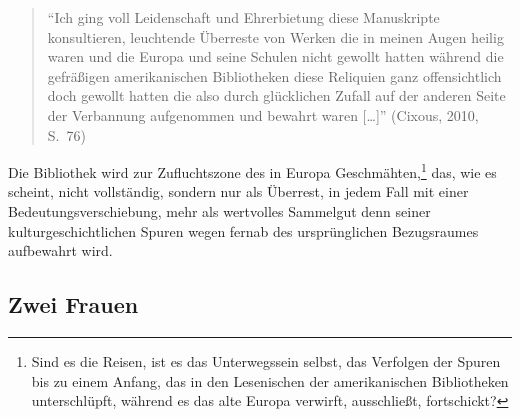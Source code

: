 \documentclass[output=paper]{langscibook}
\begin{document}
\begin{quote}
\enquote{Ich ging voll Leidenschaft und Ehrerbietung diese Manuskripte
konsultieren, leuchtende Überreste von Werken die in meinen Augen heilig
waren und die Europa und seine Schulen nicht gewollt hatten während die
gefräßigen amerikanischen Bibliotheken diese Reliquien ganz
offensichtlich doch gewollt hatten die also durch glücklichen Zufall auf
der anderen Seite der Verbannung aufgenommen und bewahrt waren
{[}\ldots{]}} (Cixous, 2010, S.~76)
\end{quote}

\noindent Die Bibliothek wird zur Zufluchtszone des in Europa
Geschmähten,\footnote{Sind es die Reisen, ist es das Unterwegssein
  selbst, das Verfolgen der Spuren bis zu einem Anfang, das in den
  Lesenischen der amerikanischen Bibliotheken unterschlüpft, während es
  das alte Europa verwirft, ausschließt, fortschickt?} das, wie es
scheint, nicht vollständig, sondern nur als Überrest, in jedem Fall mit
einer Bedeutungsverschiebung, mehr als wertvolles Sammelgut denn seiner
kulturgeschichtlichen Spuren wegen fernab des ursprünglichen
Bezugsraumes aufbewahrt wird.

\hypertarget{zwei-frauen}{%
\subsection*{Zwei Frauen}\label{zwei-frauen}}
\end{document}

